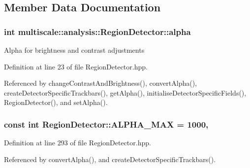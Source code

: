 \subsection{Member Data Documentation}
\hypertarget{classmultiscale_1_1analysis_1_1RegionDetector_ab768a3bbfff9835b441a889ab2cb05a6}{
\subsubsection[{alpha}]{\setlength{\rightskip}{0pt plus 5cm}int multiscale\-::analysis\-::\-Region\-Detector\-::alpha\hspace{0.3cm}{\ttfamily [private]}}}\label{classmultiscale_1_1analysis_1_1RegionDetector_ab768a3bbfff9835b441a889ab2cb05a6}
Alpha for brightness and contrast adjustments 

Definition at line 23 of file Region\-Detector.\-hpp.



Referenced by change\-Contrast\-And\-Brightness(), convert\-Alpha(), create\-Detector\-Specific\-Trackbars(), get\-Alpha(), initialise\-Detector\-Specific\-Fields(), Region\-Detector(), and set\-Alpha().

\hypertarget{classmultiscale_1_1analysis_1_1RegionDetector_a7ca1e136dc9d768f1e11cd6f770d950f}{
\subsubsection[{A\-L\-P\-H\-A\-\_\-\-M\-A\-X}]{\setlength{\rightskip}{0pt plus 5cm}const int Region\-Detector\-::\-A\-L\-P\-H\-A\-\_\-\-M\-A\-X = 1000\hspace{0.3cm}{\ttfamily [static]}, {\ttfamily [private]}}}\label{classmultiscale_1_1analysis_1_1RegionDetector_a7ca1e136dc9d768f1e11cd6f770d950f}


Definition at line 293 of file Region\-Detector.\-hpp.



Referenced by convert\-Alpha(), and create\-Detector\-Specific\-Trackbars().

